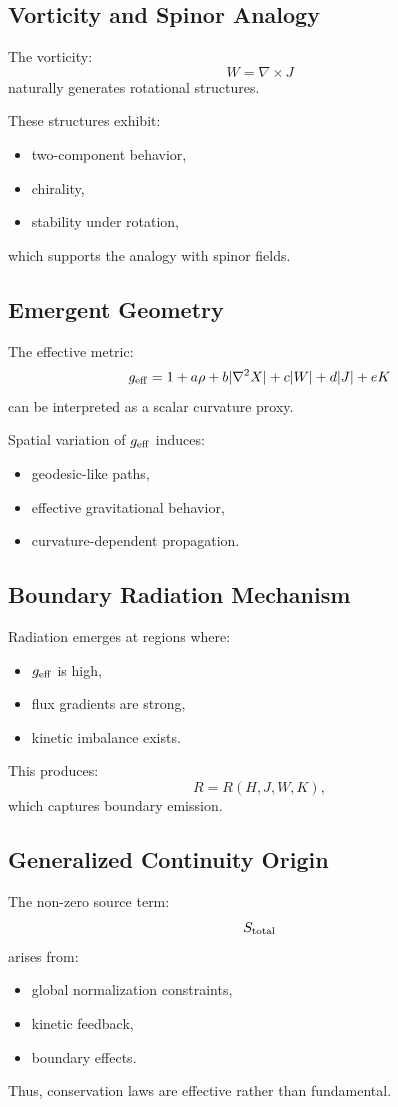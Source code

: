 \documentclass[11pt]{article}
\begin{document}
\subsection{Vorticity and Spinor Analogy}

The vorticity:
\[
W = \nabla \times J
\]
naturally generates rotational structures.

These structures exhibit:
\begin{itemize}
\item two-component behavior,
\item chirality,
\item stability under rotation,
\end{itemize}
which supports the analogy with spinor fields.

\subsection{Emergent Geometry}

The effective metric:
\[
g_{\rm eff} = 1 + a\rho + b|\nabla^2X| + c|W| + d|J| + eK
\]
can be interpreted as a scalar curvature proxy.

Spatial variation of $g_{\rm eff}$ induces:

\begin{itemize}
\item geodesic-like paths,
\item effective gravitational behavior,
\item curvature-dependent propagation.
\end{itemize}

\subsection{Boundary Radiation Mechanism}

Radiation emerges at regions where:
\begin{itemize}
\item $g_{\rm eff}$ is high,
\item flux gradients are strong,
\item kinetic imbalance exists.
\end{itemize}

This produces:
\[
R = R(H,J,W,K),
\]
which captures boundary emission.

\subsection{Generalized Continuity Origin}

The non-zero source term:
\[
S_{\rm total}
\]
arises from:

\begin{itemize}
\item global normalization constraints,
\item kinetic feedback,
\item boundary effects.
\end{itemize}

Thus, conservation laws are effective rather than fundamental.
\end{document}
